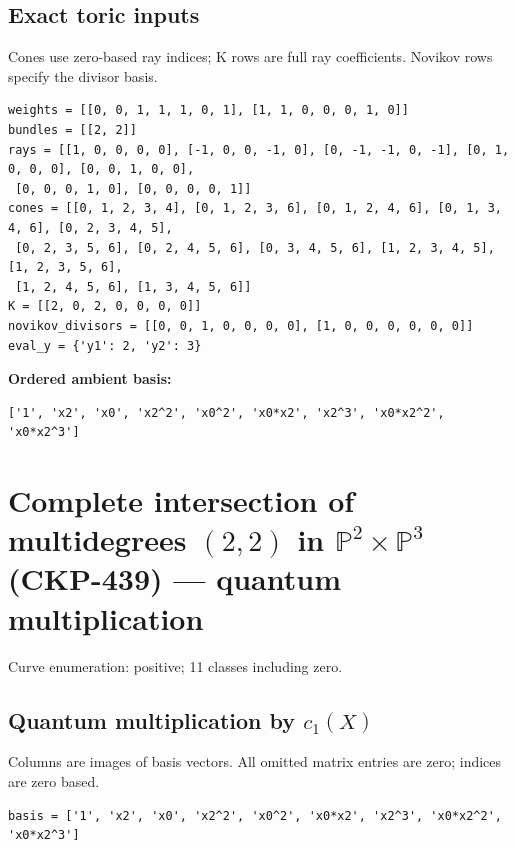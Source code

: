 \documentclass[10pt,a4paper]{article}
\begin{document}
\subsection*{Exact toric inputs}
Cones use zero-based ray indices; K rows are full ray coefficients. Novikov rows specify the divisor basis.

\begin{lstlisting}
weights = [[0, 0, 1, 1, 1, 0, 1], [1, 1, 0, 0, 0, 1, 0]]
bundles = [[2, 2]]
rays = [[1, 0, 0, 0, 0], [-1, 0, 0, -1, 0], [0, -1, -1, 0, -1], [0, 1, 0, 0, 0], [0, 0, 1, 0, 0],
 [0, 0, 0, 1, 0], [0, 0, 0, 0, 1]]
cones = [[0, 1, 2, 3, 4], [0, 1, 2, 3, 6], [0, 1, 2, 4, 6], [0, 1, 3, 4, 6], [0, 2, 3, 4, 5],
 [0, 2, 3, 5, 6], [0, 2, 4, 5, 6], [0, 3, 4, 5, 6], [1, 2, 3, 4, 5], [1, 2, 3, 5, 6],
 [1, 2, 4, 5, 6], [1, 3, 4, 5, 6]]
K = [[2, 0, 2, 0, 0, 0, 0]]
novikov_divisors = [[0, 0, 1, 0, 0, 0, 0], [1, 0, 0, 0, 0, 0, 0]]
eval_y = {'y1': 2, 'y2': 3}
\end{lstlisting}

\textbf{Ordered ambient basis:}
\begin{lstlisting}
['1', 'x2', 'x0', 'x2^2', 'x0^2', 'x0*x2', 'x2^3', 'x0*x2^2', 'x0*x2^3']
\end{lstlisting}

\clearpage\section*{Complete intersection of multidegrees $(2,2)$ in $\mathbb P^{2}\times \mathbb P^{3}$ (CKP-439) --- quantum multiplication}

Curve enumeration: positive; 11 classes including zero.
\subsection*{Quantum multiplication by $c_1(X)$}
Columns are images of basis vectors. All omitted matrix entries are zero; indices are zero based.

\begin{lstlisting}
basis = ['1', 'x2', 'x0', 'x2^2', 'x0^2', 'x0*x2', 'x2^3', 'x0*x2^2', 'x0*x2^3']
\end{lstlisting}
\end{document}
